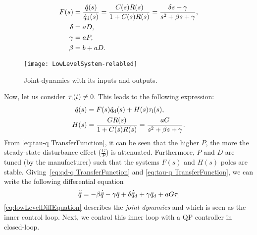 \begin{align}\label{eq:qd-q TransferFunction}
	\begin{split}	
		F(s)&=\frac{\hat{q}(s)}{\hat{q}_{\rm d}(s)}=\frac{C(s)R(s)}{1 + C(s)R(s)} = \frac{\delta s + \gamma}{s^2 + \beta s + \gamma},\\
		\delta &= aD,\\
		\gamma &= aP,\\
		\beta &= b + aD.\\
	\end{split}
\end{align}
\begin{figure}
	\centering	
	\texttt{[image: LowLevelSystem-relabled]}
	\caption{Joint-dynamics with its inputs and outputs.}
	\label{fig:lowLevelSystem}
\end{figure}
Now, let us consider $\tau_{\rm l}(t)\neq0$. This leads to the following expression:
\begin{align}\label{eq:tau-q TransferFunction}
	\begin{split}
		\hat{q}(s) &= F(s)\hat{q}_{\rm d}(s) + H(s)\tau_{\rm l}(s),\\
		H(s) &=\frac{GR(s)}{1 + C(s)R(s)} = \frac{aG}{s^2 + \beta s + \gamma }.
	\end{split}
\end{align}
From \cref{eq:tau-q TransferFunction}, it can be seen that the higher $P$, the more the steady-state disturbance effect ($\frac{G}{P}$) is attenuated. Furthermore, $P$ and $D$ are tuned (by the manufacturer) such that the systems $F(s)$ and $H(s)$ poles are stable.  
Giving~\cref{eq:qd-q TransferFunction} and \cref{eq:tau-q TransferFunction}, we can write the following  differential equation
\begin{equation}\label{eq:lowLevelDiffEquation}
	\ddot{\hat{q}} =   - \beta \dot{\hat{q}} - \gamma \hat{q} + \delta\dot{\hat{q}}_{\rm d} + \gamma \hat{q}_{\rm d} + aG \tau_{\rm l}
\end{equation}
\cref{eq:lowLevelDiffEquation} describes the \emph{joint-dynamics} and which is seen as the inner control loop. Next, we control this inner loop with a QP controller in closed-loop.
